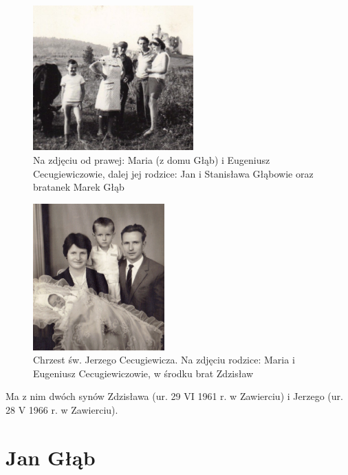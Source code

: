 \begin{figure}[!h]
\begin{center}
\includegraphics[width=0.55\textwidth]{zdjecia/maria_eugeniusz_cecugiewicz_z_rodzicami.jpg}
\caption[Maria i Eugeniusz Cecugiewiczowie z rodzicami]{Na zdjęciu od prawej: Maria (z domu Głąb) i Eugeniusz Cecugiewiczowie, dalej jej rodzice: Jan i Stanisława Głąbowie oraz bratanek Marek Głąb}
\label{rys:maria_eugeniusz_cecugiewicz_z_rodzicami}
\end{center}
\end{figure}

\begin{figure}[!h]
\begin{center}
\includegraphics[width=0.45\textwidth]{zdjecia/chrzest_jerzego_cecugiewicza.jpg}
\caption[Chrzest św. Jerzego Cecugiewicza]{Chrzest św. Jerzego Cecugiewicza. Na zdjęciu rodzice: Maria i Eugeniusz Cecugiewiczowie, w środku brat Zdzisław}
\label{rys:chrzest_jerzego_cecugiewicza}
\end{center}
\end{figure}

Ma z nim dwóch synów Zdzisława (ur. 29 VI 1961 r. w Zawierciu) i Jerzego (ur. 28 V 1966 r. w Zawierciu).


\section{Jan Głąb}

